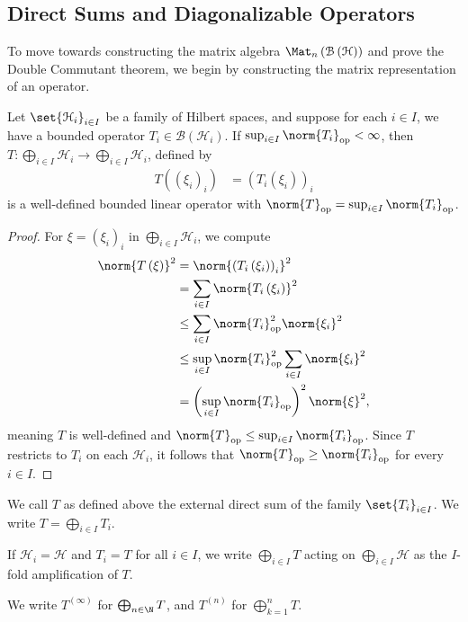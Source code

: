 \documentclass[10pt]{mypackage}
\begin{document}
\subsection{Direct Sums and Diagonalizable Operators}%
To move towards constructing the matrix algebra $\Mat_{n}\left(\mathcal{B}\left(\mathcal{H}\right)\right)$ and prove the Double Commutant theorem, we begin by constructing the matrix representation of an operator.
\begin{proposition}
  Let $\set{\mathcal{H}_{i}}_{i\in I}$ be a family of Hilbert spaces, and suppose for each $i\in I$, we have a bounded operator $T_i\in \mathcal{B}\left(\mathcal{H}_i\right)$. If $\sup_{i\in I}\norm{T_i}_{\text{op}} < \infty$, then $T\colon \bigoplus_{i\in I}\mathcal{H}_i \rightarrow \bigoplus_{i\in I}\mathcal{H}_i$, defined by
  \begin{align*}
    T\left(\left(\xi_i\right)_i\right) &= \left(T_i\left(\xi_i\right)\right)_{i}
  \end{align*}
  is a well-defined bounded linear operator with $\norm{T}_{\text{op}} = \sup_{i\in I}\norm{T_i}_{\text{op}}$.
\end{proposition}
\begin{proof}
  For $\xi = \left(\xi_i\right)_i$ in $\bigoplus_{i\in I}\mathcal{H}_i$, we compute
  \begin{align*}
    \norm{T\left(\xi\right)}^2 &= \norm{\left(T_i\left(\xi_i\right)\right)_i}^2\\
                               &= \sum_{i\in I}\norm{T_i\left(\xi_i\right)}^2\\
                               &\leq \sum_{i\in I}\norm{T_i}^2_{\text{op}}\norm{\xi_i}^2\\
                               &\leq \sup_{i\in I}\norm{T_i}^2_{\text{op}}\sum_{i\in I}\norm{\xi_i}^2\\
                               &= \left(\sup_{i\in I}\norm{T_i}_{\text{op}}\right)^2\norm{\xi}^2,
  \end{align*}
  meaning $T$ is well-defined and $\norm{T}_{\text{op}} \leq \sup_{i\in I}\norm{T_i}_{\text{op}}$. Since $T$ restricts to $T_i$ on each $\mathcal{H}_i$, it follows that $\norm{T}_{\text{op}} \geq \norm{T_i}_{\text{op}}$ for every $i\in I$.
\end{proof}
\begin{definition}
  We call $T$ as defined above the external direct sum of the family $\set{T_i}_{i\in I}$. We write $T = \bigoplus_{i\in I}T_i$.\newline

  If $\mathcal{H}_i = \mathcal{H}$ and $T_i = T$ for all $i\in I$, we write $\bigoplus_{i\in I}T$ acting on $\bigoplus_{i\in I}\mathcal{H}$ as the $I$-fold amplification of $T$.\newline

  We write $T^{(\infty)}$ for $\bigoplus_{n\in \N}T$, and $T^{(n)}$ for $\bigoplus_{k=1}^{n}T$.
\end{definition}
\end{document}
